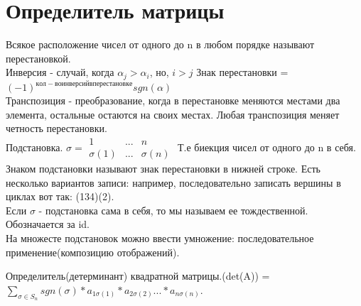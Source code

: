 \documentclass[a4paper,12pt]{article}
\begin{document}
\section{Определитель матрицы}
Всякое расположение чисел от одного до n в любом порядке называют перестановкой.\\
Инверсия - случай, когда $\alpha_j > \alpha_i$, но, $i > j$
Знак перестановки = $(-1)^{кол-во инверсий в перестановке} sgn(\alpha)$\\
Транспозиция  - преобразование, когда в перестановке меняются местами два элемента, остальные остаются на своих местах. Любая транспозиция меняет четность перестановки.\\
Подстановка. 
$\sigma = \begin{matrix}
1 & ... & n\\
\sigma(1) & ... & \sigma(n)
\end {matrix}$
Т.е биекция чисел от одного до n в себя. Знаком подстановки называют знак перестановки в нижней строке.
Есть несколько вариантов записи: например, последовательно записать вершины в циклах вот так: (134)(2). \\
Если $\sigma$ - подстановка сама в себя, то мы называем ее тождественной. Обозначается за id. \\
На множесте подстановок можно ввести умножение: последовательное применение(композицию отображений).

Определитель(детерминант) квадратной матрицы.(det(A)) = $\sum_{\sigma \in S_n} sgn(\sigma) * a_{1\sigma(1)}*a_{2\sigma(2)}...*a_{n\sigma(n)}$. 
\end{document}
